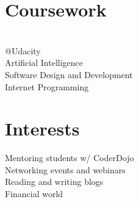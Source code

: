 \documentclass[]{rinkal_resume}
\begin{document}
\begin{minipage}[t]{0.30\textwidth}
\section{Coursework}
\textbullet{}  \\
\textbullet{}  @Udacity \\
\textbullet{} Artificial Intelligence \\
\textbullet{} Software Design and Development \\
\textbullet{} Internet Programming \\
\smallsectionsep

\section{Interests}
\textbullet{} Mentoring students w/ CoderDojo \\
\textbullet{} Networking events and webinars \\
\textbullet{} Reading and writing blogs \\
\textbullet{} Financial world \\
%
%

\end{minipage} 
\hfill
\end{document}
